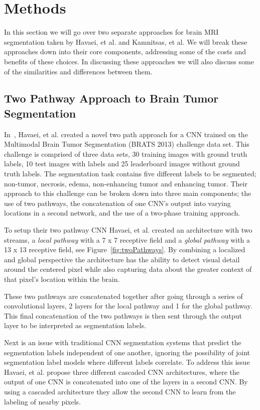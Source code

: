 \documentclass{sig-alternate}
\begin{document}
\section{Methods}
\label{sec:methods}

In this section we will go over two separate approaches for brain MRI segmentation taken by Havaei, et al. and Kamnitsas, et al. We will break these approaches down into their core components, addressing some of the costs and benefits of these choices. In discussing these approaches we will also discuss some of the similarities and differences between them.

\subsection{Two Pathway Approach to Brain Tumor Segmentation}
\label{sec:novelBrainTumorApproach}
In~\cite{Havaei:2017}, Havaei, et al. created a novel two path approach for a CNN trained on the Multimodal Brain Tumor Segmentation (BRATS 2013) challenge data set. This challenge is comprised of three data sets, 30 training images with ground truth labels, 10 test images with labels and 25 leaderboard images without ground truth labels. The segmentation task contains five different labels to be segmented; non-tumor, necrosis, edema, non-enhancing tumor and enhancing tumor. Their approach to this challenge can be broken down into three main components; the use of two pathways, the concatenation of one CNN's output into varying locations in a second network, and the use of a two-phase training approach.

To setup their two pathway CNN Havaei, et al. created an architecture with two streams, a \textit{local pathway} with a 7 x 7 receptive field and a \textit{global pathway} with a 13 x 13 receptive field, see Figure~\ref{fig:twoPathways}. By combining a localized and global perspective the architecture has the ability to detect visual detail around the centered pixel while also capturing data about the greater context of that pixel's location within the brain.

These two pathways are concatenated together after going through a series of convolutional layers, 2 layers for the local pathway and 1 for the global pathway. This final concatenation of the two pathways is then sent through the output layer to be interpreted as segmentation labels.

Next is an issue with traditional CNN segmentation systems that predict the segmentation labels independent of one another, ignoring the possibility of joint segmentation label models where different labels correlate. To address this issue Havaei, et al. propose three different cascaded CNN architectures, where the output of one CNN is concatenated into one of the layers in a second CNN. By using a cascaded architecture they allow the second CNN to learn from the labeling of nearby pixels.
\end{document}
